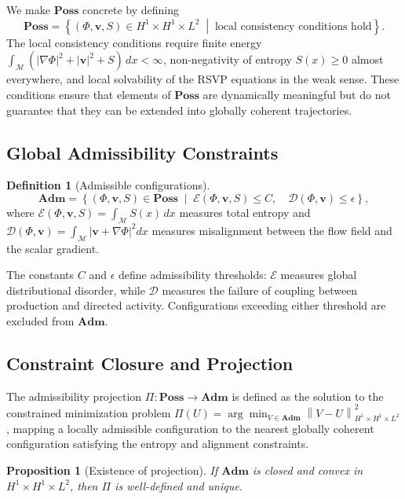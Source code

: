 \documentclass[11pt, a4paper]{article}
\theoremstyle{plain}
\newtheorem{proposition}[theorem]{Proposition}
\theoremstyle{definition}
\newtheorem{definition}[theorem]{Definition}
\newcommand{\Phifield}{\Phi}
\newcommand{\vfield}{\mathbf{v}}
\newcommand{\Sfield}{S}
\newcommand{\statespace}{\mathcal{M}}
\newcommand{\Poss}{\mathbf{Poss}}
\newcommand{\Adm}{\mathbf{Adm}}
\newcommand{\norm}[1]{\left\lVert #1 \right\rVert}
\begin{document}
We make $\Poss$ concrete by defining
\[
  \Poss =
  \left\{
    (\Phifield, \vfield, \Sfield)
    \in H^1 \times H^1 \times L^2
    \;\middle|\;
    \text{local consistency conditions hold}
  \right\}.
\]
The local consistency conditions require finite energy
$\int_{\statespace}(|\nabla \Phifield|^2 + |\vfield|^2 + \Sfield)\, dx < \infty$,
non-negativity of entropy $\Sfield(x) \geq 0$ almost everywhere, and local
solvability of the RSVP equations in the weak sense. These conditions ensure
that elements of $\Poss$ are dynamically meaningful but do not guarantee that
they can be extended into globally coherent trajectories.

\subsection{Global Admissibility Constraints}

\begin{definition}[Admissible configurations]
\[
  \Adm =
  \left\{
    (\Phifield, \vfield, \Sfield) \in \Poss
    \;\middle|\;
    \mathcal{E}(\Phifield, \vfield, \Sfield) \leq C,
    \quad
    \mathcal{D}(\Phifield, \vfield) \leq \epsilon
  \right\},
\]
where $\mathcal{E}(\Phifield, \vfield, \Sfield) = \int_{\statespace} \Sfield(x)\, dx$
measures total entropy and
$\mathcal{D}(\Phifield, \vfield) = \int_{\statespace} |\vfield + \nabla \Phifield|^2 dx$
measures misalignment between the flow field and the scalar gradient.
\end{definition}

The constants $C$ and $\epsilon$ define admissibility thresholds:
$\mathcal{E}$ measures global distributional disorder, while $\mathcal{D}$
measures the failure of coupling between production and directed activity.
Configurations exceeding either threshold are excluded from $\Adm$.

\subsection{Constraint Closure and Projection}

The admissibility projection $\Pi : \Poss \to \Adm$ is defined as the
solution to the constrained minimization problem
$\Pi(U) = \arg\min_{V \in \Adm} \norm{V - U}_{H^1 \times H^1 \times L^2}^2$,
mapping a locally admissible configuration to the nearest globally coherent
configuration satisfying the entropy and alignment constraints.

\begin{proposition}[Existence of projection]
If $\Adm$ is closed and convex in $H^1 \times H^1 \times L^2$, then $\Pi$ is
well-defined and unique.
\end{proposition}
\end{document}
